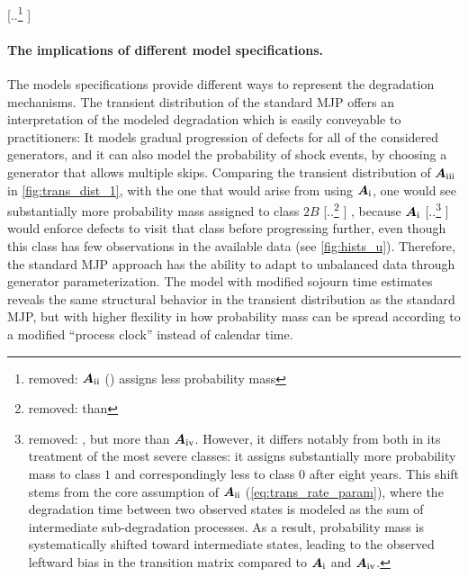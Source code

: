 \documentclass{article}
\newcommand{\RN}[1]{\textup{\uppercase\expandafter{\romannumeral#1}}}
\providecommand{\DIFadd}[1]{{\protect\color{blue} \sf #1}} %
\providecommand{\DIFdel}[1]{{\protect\color{red} [..\footnote{removed: #1} ]}} %
\providecommand{\DIFaddbegin}{} %
\providecommand{\DIFaddend}{} %
\providecommand{\DIFdelbegin}{} %
\providecommand{\DIFdelend}{} %
\begin{document}
\DIFdelbegin \DIFdel{$\bm{A}_{\RN{2}}$ () assigns less probability mass }\DIFdelend \DIFaddbegin \paragraph{\DIFadd{The implications of different model specifications.}}
\DIFadd{The models specifications provide different ways to represent the degradation mechanisms. The transient distribution of the standard MJP offers an interpretation of the modeled degradation which is easily conveyable to practitioners: 
It models gradual progression of defects for all of the considered generators,
and it can also model the probability of shock events, by choosing a generator that allows multiple skips.
Comparing the transient distribution of $\bm{A}_{\RN{3}}$ in \cref{fig:trans_dist_1}, with the one that would arise from using $\bm{A}_{\RN{1}}$, one would see substantially more probability mass assigned }\DIFaddend to class $2B$\DIFdelbegin \DIFdel{than }\DIFdelend \DIFaddbegin \DIFadd{, because }\DIFaddend $\bm{A}_{\RN{1}}$ \DIFdelbegin \DIFdel{, but more than $\bm{A}_{\RN{4}}$. However, it differs notably from both in its treatment of the most severe classes: it assigns substantially more probability mass to class $1$ and correspondingly less to class $0$ after eight years.
This shift stems from the core assumption of $\bm{A}_{\RN{2}}$ (\cref{eq:trans_rate_param}), where the degradation time between two observed states is modeled as the sum of intermediate sub-degradation processes. As a result, probability mass is systematically shifted toward intermediate states, leading to the observed leftward bias in the transition matrix compared to $\bm{A}_{\RN{1}}$ and $\bm{A}_{\RN{4}}$. }\DIFdelend \DIFaddbegin \DIFadd{would enforce defects to visit that class before progressing further, even though this class has few observations in the available data (see \cref{fig:hists_u}). Therefore, the standard MJP approach has the ability to adapt to unbalanced data through generator parameterization. 
The model with modified sojourn time estimates reveals the same structural behavior in the transient distribution as the standard MJP, but with higher flexility in how probability mass can be spread according to a modified ``process clock'' instead of calendar time.
}\DIFaddend 
\end{document}
